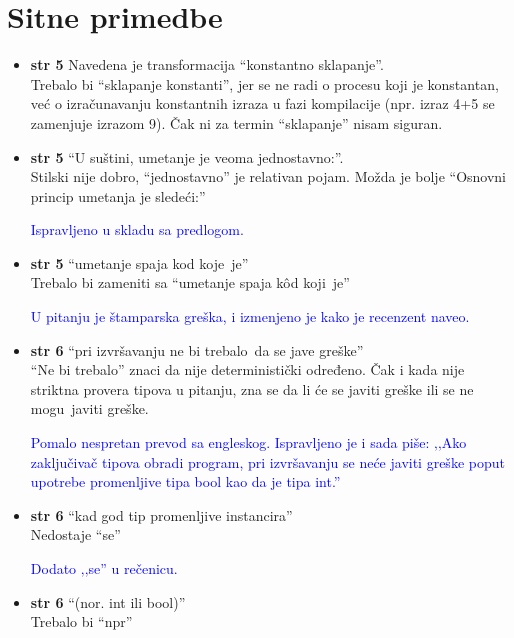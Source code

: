 \documentclass[a4paper]{report}
\newcommand{\odgovor}[1]{\textcolor{blue}{#1}}
\begin{document}
\section{Sitne primedbe}
\begin{itemize}
\item \textbf{str 5} Navedena je transformacija ``konstantno sklapanje''.\\Trebalo bi ``sklapanje konstanti'', jer se ne radi o procesu koji je konstantan, već o izračunavanju konstantnih izraza u fazi kompilacije (npr. izraz 4+5 se zamenjuje izrazom 9). Čak ni za termin ``sklapanje'' nisam siguran.

\item \textbf{str 5} ``U suštini, umetanje je veoma jednostavno:''.\\ Stilski nije dobro, ``jednostavno'' je relativan pojam. Možda je bolje ``Osnovni princip umetanja je sledeći:''

\odgovor{Ispravljeno u skladu sa predlogom.}

\item \textbf{str 5} ``umetanje spaja \color{blue}kod koje\color{black}~je''\\ Trebalo bi zameniti sa ``umetanje spaja \color{blue}kôd koji\color{black}~je''

\odgovor{U pitanju je štamparska greška, i izmenjeno je kako je recenzent naveo.}

\item \textbf{str 6} ``pri izvršavanju \color{blue}ne bi trebalo\color{black}~da se jave greške'' \\ ``Ne bi trebalo'' znaci da nije deterministički određeno. Čak i kada nije striktna provera tipova u pitanju, zna se da li će se javiti greške ili se \color{blue}ne mogu\color{black}~javiti greške.

\odgovor{Pomalo nespretan prevod sa engleskog. Ispravljeno je i sada piše: ‚‚Ako zaključivač tipova obradi program, pri izvršavanju se neće javiti greške poput upotrebe promenljive tipa bool kao da je tipa int.''}


\item \textbf{str 6} ``kad god tip promenljive instancira'' \\ Nedostaje ``se''

\odgovor{Dodato ‚‚se'' u rečenicu.}

\item \textbf{str 6} ``(\color{blue}nor\color{black}. int ili bool)'' \\ Trebalo bi ``npr''


\end{itemize}
\end{document}
